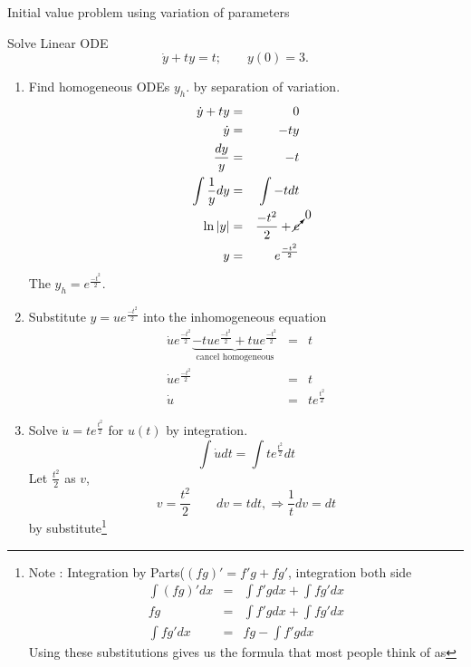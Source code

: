 \begin{example}
  Initial value problem using variation of parameters
\end{example}
Solve Linear ODE
\begin{equation*}
  \dot{y} + ty = t; \qquad y(0) = 3.
\end{equation*}
\begin{enumerate}
\item Find homogeneous ODEs $y_h$. by separation of variation. 
  \begin{eqnarray*}
    \dot{y} + ty &=& 0 \\
    \dot{y} &=& -ty \\
    \frac{dy}{y} &=& -t \\
    \int \frac{1}{y} dy &=& \int -t dt \\
    \ln |y| &=& \frac{-t^2}{2} + \cancelto{0}{c}\\
    y &=& e^{\frac{-t^2}{2}} 
  \end{eqnarray*}
  The $\displaystyle y_h \displaystyle = \displaystyle e^{\frac{-t^2}{2}}$.
\item Substitute $\displaystyle y \displaystyle =
  \displaystyle ue^{\frac{-t^2}{2}}$ into the inhomogeneous equation
  \begin{eqnarray*}
    \dot{u} e^{\frac{-t^2}{2}} \underbrace{-tue^{\frac{-t^2}{2}} + tue^{\frac{-t^2}{2}}}_{\text{cancel homogeneous}}
    &=& t\\
    \dot{u} e^{\frac{-t^2}{2}} &=& t\\
    \dot{u} &=& te^{\frac{t^2}{2}}
  \end{eqnarray*}
\item Solve $\dot{u} = te^{\frac{t^2}{2}}$ for $u(t)$ by integration.
  \begin{equation*}
    \int \dot{u} dt = \int te^{\frac{t^2}{2}} dt
  \end{equation*}
  Let $\frac{t^2}{2}$ as $v$,
  \begin{equation*}
    v = \frac{t^2}{2} \qquad dv = tdt,  \Rightarrow \frac{1}{t} dv = dt
  \end{equation*}
  by substitute\footnote{
    Note : Integration by Parts($(fg)' = f'g + fg'$, integration both side
    \begin{eqnarray*}
      \int (fg)' dx &=& \int f'gdx + \int fg'dx\\
      fg &=&  \int f'gdx + \int fg'dx \\
      \int fg' dx &=& fg - \int f'gdx 
    \end{eqnarray*}
    Using these substitutions gives us the formula that most people think of as
}
\end{enumerate}
